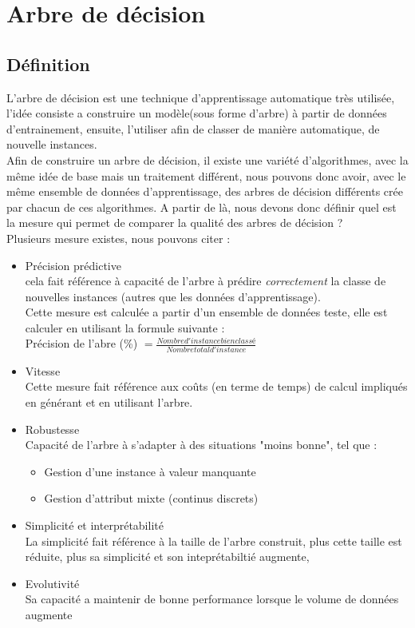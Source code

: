 \documentclass[a4paper, 11pt]{report}
\begin{document}
\section{Arbre de décision}
\subsection{Définition}
L'arbre de décision est une technique d'apprentissage automatique très utilisée, l'idée consiste a construire un modèle(sous forme d'arbre) à partir de données d'entrainement, ensuite, l'utiliser afin de classer de manière automatique, de nouvelle instances. \\
Afin de construire un arbre de décision, il existe une variété d'algorithmes, avec la même idée de base mais un traitement différent, nous pouvons donc avoir, avec le même ensemble de données d'apprentissage, des arbres de décision différents crée par chacun de ces algorithmes. A partir de là, nous devons donc définir quel est la mesure qui permet de comparer la qualité des arbres de décision ?\\
Plusieurs mesure existes, nous pouvons citer :

\begin{itemize}
\item Précision prédictive \\
cela fait référence à capacité de l'arbre à prédire \emph{correctement} la classe de nouvelles instances (autres que les données d'apprentissage).\\
Cette mesure est calculée a partir d'un ensemble de données teste, elle est calculer en utilisant la formule suivante :\\
Précision de l'abre (\%) $= \frac{Nombre d'instance bien classé}{Nombre total d'instance}$ 

\item Vitesse\\
Cette mesure fait référence aux coûts (en terme de temps) de calcul impliqués en générant et en utilisant l'arbre.


\item Robustesse \\
Capacité de l'arbre à s'adapter à des situations "moins bonne", tel que :\\
\begin{itemize}
\item Gestion d'une instance à valeur manquante
\item Gestion d'attribut mixte (continus discrets)
\end{itemize}


\item Simplicité et interprétabilité \\
La simplicité fait référence à la taille de l'arbre construit, plus cette taille est réduite, plus sa simplicité et son inteprétabiltié augmente, 


\item Evolutivité\\
Sa capacité a maintenir de bonne performance lorsque le volume de données augmente
\end{itemize}
\end{document}
